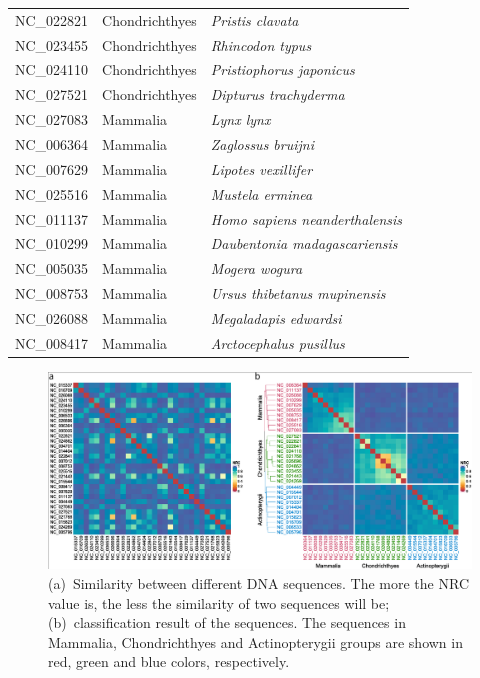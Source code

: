 \documentclass[extendedabs]{recpad2k}
\begin{document}
\begin{table}[b!]
\begin{tabular}{lll}
      NC\_022821 & Chondrichthyes & \textit{Pristis clavata} \\
      NC\_023455 & Chondrichthyes & \textit{Rhincodon typus} \\
      NC\_024110 & Chondrichthyes & \textit{Pristiophorus japonicus} \\
      NC\_027521 & Chondrichthyes & \textit{Dipturus trachyderma} \\
      NC\_027083 & Mammalia & \textit{Lynx lynx} \\
      NC\_006364 & Mammalia & \textit{Zaglossus bruijni} \\
      NC\_007629 & Mammalia & \textit{Lipotes vexillifer} \\
      NC\_025516 & Mammalia & \textit{Mustela erminea} \\
      NC\_011137 & Mammalia & \textit{Homo sapiens neanderthalensis} \\
      NC\_010299 & Mammalia & \textit{Daubentonia madagascariensis} \\
      NC\_005035 & Mammalia & \textit{Mogera wogura} \\
      NC\_008753 & Mammalia & \textit{Ursus thibetanus mupinensis} \\
      NC\_026088 & Mammalia & \textit{Megaladapis edwardsi} \\
      NC\_008417 & Mammalia & \textit{Arctocephalus pusillus} \\
      \hline
   \end{tabular}
\end{table}

\begin{figure}[t!]
   \includegraphics[width=\textwidth]{fig_nrc.pdf}
   \caption{(a)~Similarity between different DNA sequences. The more the NRC value is, the less the similarity of two sequences will be; (b)~classification result of the sequences. The sequences in Mammalia, Chondrichthyes and Actinopterygii groups are shown in red, green and blue colors, respectively.}
   \label{fig.nrc}
\end{figure}
\end{document}
